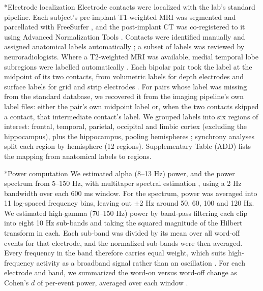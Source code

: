 \documentclass[10pt,twocolumn]{article}  %
\makeatletter
\renewcommand\subsection{\@startsection{subsection}{2}{\z@}{-8pt plus -2pt minus -1pt}{2pt}{\raggedright\sffamily\bfseries\normalsize}}
\makeatother
\begin{document}
\subsection*{Electrode localization}\label{electrode-localization}
Electrode contacts were localized with the lab's standard pipeline. Each subject's pre-implant T1-weighted MRI was segmented and parcellated with FreeSurfer \citep{Fischl_2002,Fischl_2004,Desikan_2006}, and the post-implant CT was co-registered to it using Advanced Normalization Tools \citep{Avants_2008}. Contacts were identified manually and assigned anatomical labels automatically \citep{Dykstra_2012}; a subset of labels was reviewed by neuroradiologists. Where a T2-weighted MRI was available, medial temporal lobe subregions were labelled automatically \citep{Yushkevich_2014}. Each bipolar pair took the label at the midpoint of its two contacts, from volumetric labels for depth electrodes and surface labels for grid and strip electrodes \citep{Azarion_2014}. For pairs whose label was missing from the standard database, we recovered it from the imaging pipeline's own label files: either the pair's own midpoint label or, when the two contacts skipped a contact, that intermediate contact's label. We grouped labels into six regions of interest: frontal, temporal, parietal, occipital and limbic cortex (excluding the hippocampus), plus the hippocampus, pooling hemispheres \citep{Burke_2013}; synchrony analyses split each region by hemisphere (12 regions). Supplementary Table (ADD) lists the mapping from anatomical labels to regions.

\subsection*{Power computation}\label{power}
We estimated alpha (8--13 Hz) power, and the power spectrum from 5--150 Hz, with multitaper spectral estimation \citep{Thomson_1982,Slepian_1978,Percival_1993,Prerau_2017}, using a 2 Hz bandwidth over each 600 ms window. For the spectrum, power was averaged into 11 log-spaced frequency bins, leaving out $\pm$2 Hz around 50, 60, 100 and 120 Hz. We estimated high-gamma (70--150 Hz) power by band-pass filtering each clip into eight 10 Hz sub-bands and taking the squared magnitude of the Hilbert transform in each. Each sub-band was divided by its mean over all word-off events for that electrode, and the normalized sub-bands were then averaged. Every frequency in the band therefore carries equal weight, which suits high-frequency activity as a broadband signal rather than an oscillation \citep{Burke_2015a,Edwards_2009,Bruns_2004,Manning_2009,Ray_2011}. For each electrode and band, we summarized the word-on versus word-off change as Cohen's $d$ of per-event power, averaged over each window \citep{Cohen_2013,Lakens_2013}.
\end{document}
